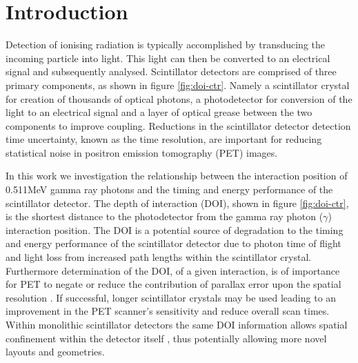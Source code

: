 \section{Introduction} 
Detection of ionising radiation is typically accomplished by transducing the incoming particle into light. This light can then be converted to an electrical signal and subsequently analysed. Scintillator detectors are comprised of three primary components, as shown in figure \ref{fig:doi-ctr}. Namely a scintillator crystal for creation of thousands of optical photons, a photodetector for conversion of the light to an electrical signal and a layer of optical grease between the two components to improve coupling. Reductions in the scintillator detector detection time uncertainty, known as the time resolution, are important for reducing statistical noise in positron emission tomography (PET) images\cite{Moses_Ullisch_2006}.

In this work we investigation the relationship between the interaction position of 0.511MeV gamma ray photons and the timing and energy performance of the scintillator detector. The depth of interaction (DOI), shown in figure \ref{fig:doi-ctr}, is the shortest distance to the photodetector from the gamma ray photon ($\gamma$) interaction position. The DOI is a potential source of degradation to the timing and energy performance of the scintillator detector due to photon time of flight and light loss from increased path lengths within the scintillator crystal. Furthermore determination of the DOI, of a given interaction, is of importance for PET to negate or reduce the contribution of parallax error upon the spatial resolution \cite{Moses_2001}\cite{Humm_Rosenfeld_Del_Guerra_2003}. If successful, longer scintillator crystals may be used leading to an improvement in the PET scanner's sensitivity and reduce overall scan times. Within monolithic scintillator detectors the same DOI information allows spatial confinement within the detector itself \cite{am_Borghi_Seifert_Schaart_2013}\cite{Maas_Bruyndonckx_Schaart_2012}, thus potentially allowing more novel\cite{Dendooven_Lohner_Beekman_2009}\cite{n_der_Lei_van_Dam_Schaart_2013} layouts and geometries.

